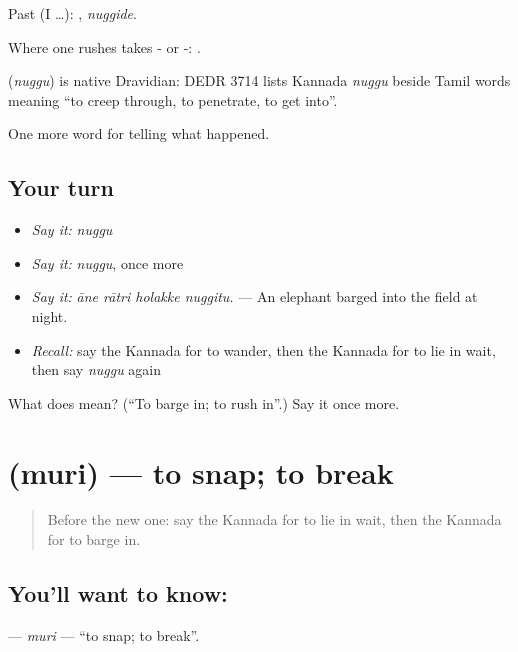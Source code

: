 Past (I …): , \emph{nuggide}.

Where one rushes takes - or -:  .

\begin{cousinweb}
\textbf{} (\emph{nuggu}) is native Dravidian: DEDR 3714 lists Kannada \emph{nuggu} beside Tamil words meaning \textquotedblleft{}to creep through, to penetrate, to get into\textquotedblright{}.
\end{cousinweb}

\begin{grammarlens}[title={What you've built}]
One more word for telling what happened.
\end{grammarlens}

\subsection*{Your turn}
\begin{itemize}
\raggedright
  \item \emph{Say it:} \emph{nuggu}
  \item \emph{Say it:} \emph{nuggu}, once more
  \item \emph{Say it:} \emph{āne rātri holakke nuggitu.} — An elephant barged into the field at night.
  \item \emph{Recall:} say the Kannada for to wander, then the Kannada for to lie in wait, then say \emph{nuggu} again
\end{itemize}

\begin{tcolorbox}[breakable,colback=teal!4,colframe=teal!35!black,title={Before you move on}]
What does  mean? (\textquotedblleft{}To barge in; to rush in\textquotedblright{}.) Say it once more.
\end{tcolorbox}
\section[\texorpdfstring{\kn{ಮುರಿ} (muri)}{ಮುರಿ (muri)}]{ (muri) — to snap; to break}

\label{lesson:KA-C360-muri}



\begin{quote}
Before the new one: say the Kannada for to lie in wait, then the Kannada for to barge in.
\end{quote}

\subsection*{You'll want to know: }
\textbf{} — \emph{muri} — \textquotedblleft{}to snap; to break\textquotedblright{}.

